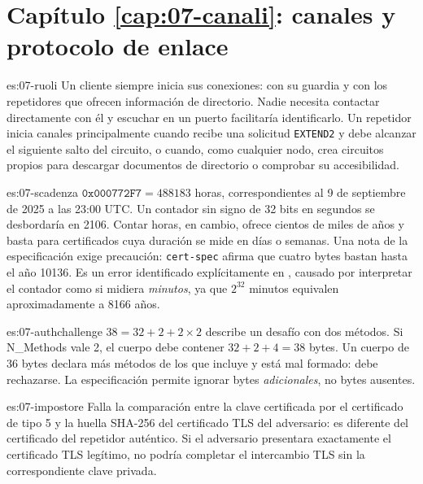 \section*{Capítulo \ref{cap:07-canali}: canales y protocolo de enlace}

\begin{soluzione}{es:07-ruoli}
Un cliente siempre inicia sus conexiones: con su guardia y con los repetidores que ofrecen información de directorio. Nadie necesita contactar directamente con él y escuchar en un puerto facilitaría identificarlo. Un repetidor inicia canales principalmente cuando recibe una solicitud \texttt{EXTEND2} y debe alcanzar el siguiente salto del circuito, o cuando, como cualquier nodo, crea circuitos propios para descargar documentos de directorio o comprobar su accesibilidad.
\end{soluzione}

\begin{soluzione}{es:07-scadenza}
$\texttt{0x000772F7}=488183$ horas, correspondientes al 9 de septiembre de 2025 a las 23:00 UTC. Un contador sin signo de 32 bits en segundos se desbordaría en 2106. Contar horas, en cambio, ofrece cientos de miles de años y basta para certificados cuya duración se mide en días o semanas. Una nota de la especificación exige precaución: \texttt{cert-spec} afirma que cuatro bytes bastan hasta el año 10136. Es un error identificado explícitamente en , causado por interpretar el contador como si midiera \emph{minutos}, ya que $2^{32}$ minutos equivalen aproximadamente a 8166 años.
\end{soluzione}

\begin{soluzione}{es:07-authchallenge}
$38=32+2+2\times2$ describe un desafío con dos métodos. Si N\_Methods vale 2, el cuerpo debe contener $32+2+4=38$ bytes. Un cuerpo de 36 bytes declara más métodos de los que incluye y está mal formado: debe rechazarse. La especificación permite ignorar bytes \emph{adicionales}, no bytes ausentes.
\end{soluzione}

\begin{soluzione}{es:07-impostore}
Falla la comparación entre la clave certificada por el certificado de tipo 5 y la huella SHA-256 del certificado TLS del adversario: es diferente del certificado del repetidor auténtico. Si el adversario presentara exactamente el certificado TLS legítimo, no podría completar el intercambio TLS sin la correspondiente clave privada.
\end{soluzione}

